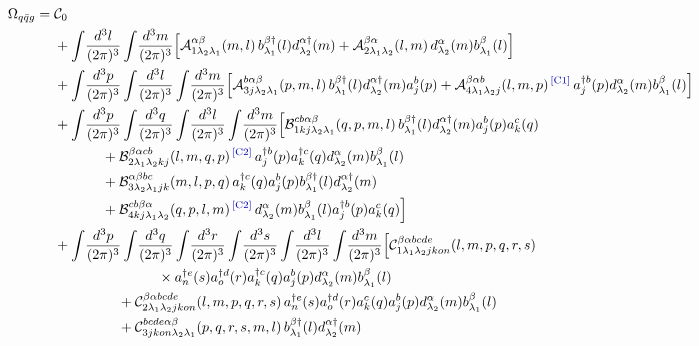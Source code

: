 \documentclass[11pt]{article}
\newcommand{\dg}{\dagger}
\newcommand{\ip}[1]{\int\!\frac{d^{3}#1}{(2\pi)^{3}}}
\newcommand{\OM}{\Omega}
\newcommand{\A}{\mathcal{A}}
\newcommand{\B}{\mathcal{B}}
\newcommand{\C}{\mathcal{C}}
\newcommand{\chg}[1]{{\color{blue!70!black}\textsuperscript{\,[C#1]}}}
\begin{document}
{\footnotesize
\begin{align}
\OM_{q\bar qg}=\;&\C_{0}\nonumber\\
&+\ip{l}\ip{m}\Big[\A^{\alpha\beta}_{1\lambda_{2}\lambda_{1}}(m,l)\,
b^{\beta\dg}_{\lambda_{1}}(l)d^{\alpha\dg}_{\lambda_{2}}(m)
+\A^{\beta\alpha}_{2\lambda_{1}\lambda_{2}}(l,m)\,
d^{\alpha}_{\lambda_{2}}(m)b^{\beta}_{\lambda_{1}}(l)\Big]\nonumber\\
&+\ip{p}\ip{l}\ip{m}\Big[\A^{b\alpha\beta}_{3j\lambda_{2}\lambda_{1}}(p,m,l)\,
b^{\beta\dg}_{\lambda_{1}}(l)d^{\alpha\dg}_{\lambda_{2}}(m)a^{b}_{j}(p)
+\A^{\beta\alpha b}_{4\lambda_{1}\lambda_{2}j}(l,m,p)\chg{1}\,
a^{\dg b}_{j}(p)d^{\alpha}_{\lambda_{2}}(m)b^{\beta}_{\lambda_{1}}(l)\Big]\nonumber\\
&+\ip{p}\ip{q}\ip{l}\ip{m}\Big[
\B^{cb\alpha\beta}_{1kj\lambda_{2}\lambda_{1}}(q,p,m,l)\,
b^{\beta\dg}_{\lambda_{1}}(l)d^{\alpha\dg}_{\lambda_{2}}(m)a^{b}_{j}(p)a^{c}_{k}(q)\nonumber\\
&\hspace{1.2cm}
+\B^{\beta\alpha cb}_{2\lambda_{1}\lambda_{2}kj}(l,m,q,p)\chg{2}\,
a^{\dg b}_{j}(p)a^{\dg c}_{k}(q)d^{\alpha}_{\lambda_{2}}(m)b^{\beta}_{\lambda_{1}}(l)\nonumber\\
&\hspace{1.2cm}
+\B^{\alpha\beta bc}_{3\lambda_{2}\lambda_{1}jk}(m,l,p,q)\,
a^{\dg c}_{k}(q)a^{b}_{j}(p)b^{\beta\dg}_{\lambda_{1}}(l)d^{\alpha\dg}_{\lambda_{2}}(m)\nonumber\\
&\hspace{1.2cm}
+\B^{cb\beta\alpha}_{4kj\lambda_{1}\lambda_{2}}(q,p,l,m)\chg{2}\,
d^{\alpha}_{\lambda_{2}}(m)b^{\beta}_{\lambda_{1}}(l)a^{\dg b}_{j}(p)a^{c}_{k}(q)\Big]\nonumber\\
&+\ip{p}\ip{q}\ip{r}\ip{s}\ip{l}\ip{m}\Big[
\C^{\beta\alpha bcde}_{1\lambda_{1}\lambda_{2}jkon}(l,m,p,q,r,s)
\nonumber\\&\hspace{2.6cm}\times
a^{\dg e}_{n}(s)a^{\dg d}_{o}(r)a^{\dg c}_{k}(q)a^{b}_{j}(p)
d^{\alpha}_{\lambda_{2}}(m)b^{\beta}_{\lambda_{1}}(l)\nonumber\\
&\hspace{1.6cm}
+\C^{\beta\alpha bcde}_{2\lambda_{1}\lambda_{2}jkon}(l,m,p,q,r,s)\,
a^{\dg e}_{n}(s)a^{\dg d}_{o}(r)a^{c}_{k}(q)a^{b}_{j}(p)
d^{\alpha}_{\lambda_{2}}(m)b^{\beta}_{\lambda_{1}}(l)\nonumber\\
&\hspace{1.6cm}
+\C^{bcde\alpha\beta}_{3jkon\lambda_{2}\lambda_{1}}(p,q,r,s,m,l)\,
b^{\beta\dg}_{\lambda_{1}}(l)d^{\alpha\dg}_{\lambda_{2}}(m)

\end{align}}
\end{document}
